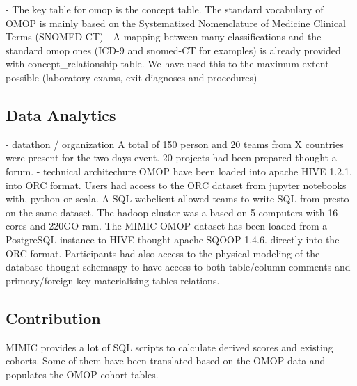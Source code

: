 - The key table for omop is the concept table. The standard vocabulary of OMOP
is mainly based on the Systematized Nomenclature of Medicine Clinical Terms
(SNOMED-CT)
- A mapping between many classifications and the standard omop ones (ICD-9 and
snomed-CT for examples) is already provided with concept_relationship table. We
have used this to the maximum extent possible (laboratory exams, exit diagnoses
and procedures)

\subsection{Data Analytics}
- datathon / organization
A total of 150 person and 20 teams from X countries were present for the two
days event. 20 projects had been prepared thought a forum.
- technical architechure
OMOP have been loaded into apache HIVE 1.2.1. into ORC format. Users had access
to the ORC dataset from jupyter notebooks with, python or scala. A SQL
webclient allowed teams to write SQL from presto on the same dataset. The
hadoop cluster was a based on 5 computers with 16 cores and 220GO ram.
The MIMIC-OMOP dataset has been loaded from a PostgreSQL instance to HIVE
thought apache SQOOP 1.4.6. directly into the ORC format. 
Participants had also access to the physical modeling of the database thought
schemaspy to have access to both table/column comments and primary/foreign key
materialising tables relations.
\subsection{Contribution}
MIMIC provides a lot of SQL scripts to calculate derived scores and existing
cohorts. Some of them have been translated based on the OMOP data and
populates the OMOP cohort tables.

